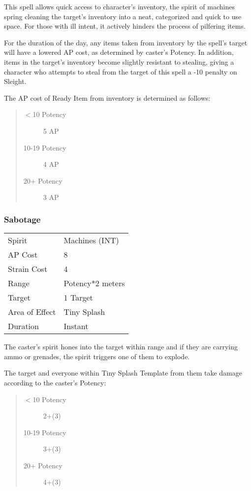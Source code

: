 \documentclass[11pt,a4paper,twocolumn]{book}
\begin{document}
\medskip

This spell allows quick access to character's inventory, the spirit of machines spring cleaning the target's inventory into a neat, categorized and quick to use space. For those with ill intent, it actively hinders the process of pilfering items. 

For the duration of the day, any items taken from inventory by the spell's target will have a lowered AP cost, as determined by caster's Potency. In addition, items in the target's inventory become slightly resistant to stealing, giving a character who attempts to steal from the target of this spell a -10 penalty on Sleight.

The AP cost of Ready Item from inventory is determined as follows:
\begin{quote}
	\begin{description}
		\item[$<$10 Potency] 	5 AP
		\item[10-19 Potency] 	4 AP
		\item[20+ Potency]  	3 AP
	\end{description}	
\end{quote}

\subsubsection*{Sabotage}
{
	\begin{tabu} to 75mm{| X[l,4] | X[l,7] |}
		\hline
		Spirit 			&  Machines (INT)			\\
		AP Cost	      	&  8					\\
		Strain Cost     &  4					\\
		Range     		&  Potency*2 meters		\\
		Target      	&  1 Target				\\
		Area of Effect  &  Tiny Splash	 				\\
		Duration     	&  Instant				\\ \hline
	\end{tabu}
	
}

\medskip

The caster's spirit hones into the target within range and if they are carrying ammo or grenades, the spirit triggers one of them to explode. 

The target and everyone within Tiny Splash Template from them take damage according to the caster's Potency:
\begin{quote}
	\begin{description}
		\item[$<$10 Potency] 	2+(3)
		\item[10-19 Potency] 	3+(3)
		\item[20+ Potency] 	    4+(3)
	\end{description}
\end{quote}
\end{document}
